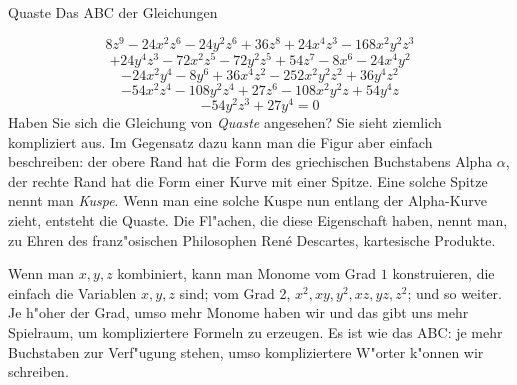 \begin{surferPage}{Quaste}
Das ABC der Gleichungen

  \smallskip
\[8z^9-24x^2z^6-24y^2z^6+36z^8+24x^4z^3-168x^2y^2z^3\]
\[+24y^4z^3-72x^2z^5-72y^2z^5+54z^7-8x^6-24x^4y^2\]
\[-24x^2y^4-8y^6 + 36x^4z^2-252x^2y^2z^2+36y^4z^2\]
\[- 54x^2z^4-108y^2z^4 + 27z^6-108x^2y^2z + 54y^4z\]
\[-54y^2z^3 + 27y^4 = 0\]
\singlespacing
Haben Sie sich die Gleichung von {\it Quaste} angesehen? Sie sieht ziemlich kompliziert aus. Im Gegensatz dazu kann man die Figur aber einfach beschreiben: der obere Rand hat die Form des griechischen Buchstabens Alpha $\alpha$, der rechte Rand hat die Form einer Kurve mit einer Spitze. Eine solche Spitze nennt man {\it Kuspe}. Wenn man eine solche Kuspe nun entlang der Alpha-Kurve zieht, entsteht die Quaste. Die Fl"achen, die diese Eigenschaft haben, nennt man, zu Ehren des franz"osischen Philosophen Ren\'e Descartes, kartesische Produkte.

Wenn man $x,y, z$ kombiniert, kann man Monome vom Grad $1$ konstruieren, die einfach die Variablen $x,y, z $ sind; vom Grad 2,  $x^2, xy, y^2, xz, yz, z^2$; und so weiter. Je h"oher der Grad, umso mehr Monome haben wir und das gibt uns mehr Spielraum, um kompliziertere Formeln zu erzeugen. Es ist wie das ABC: je mehr Buchstaben zur Verf"ugung stehen, umso kompliziertere W"orter k"onnen wir schreiben.
\end{surferPage}
